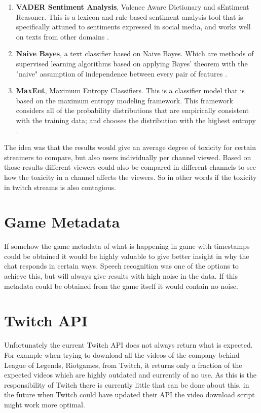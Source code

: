 \documentclass[final]{report}
\begin{document}
\begin{enumerate}
	\item \textbf{VADER Sentiment Analysis}, Valence Aware Dictionary and sEntiment Reasoner. This is a lexicon and rule-based sentiment analysis tool that is specifically attuned to sentiments expressed in social media, and works well on texts from other domains \cite{vader}.
	\item \textbf{Naive Bayes}, a text classifier based on Naive Bayes. Which are methods of supervised learning algorithms based on applying Bayes' theorem with the "naive" assumption of independence between every pair of features \cite{naivebayes}.
	\item \textbf{MaxEnt}, Maximum Entropy Classifiers. This is a classifier model that is based on the maximum entropy modeling framework. This framework considers all of the probability distributions that are empirically consistent with the training data; and chooses the distribution with the highest entropy \cite{maxent}.
\end{enumerate}

The idea was that the results would give an average degree of toxicity for certain streamers to compare, but also users individually per channel viewed. Based on those results different viewers could also be compared in different channels to see how the toxicity in a channel affects the viewers. So in other words if the toxicity in twitch streams is also contagious.

\section{Game Metadata}

If somehow the game metadata of what is happening in game with timestamps could be obtained it would be highly valuable to give better insight in why the chat responds in certain ways. Speech recognition was one of the options to achieve this, but will always give results with high noise in the data. If this metadata could be obtained from the game itself it would contain no noise.

\section{Twitch API}

Unfortunately the current Twitch API does not always return what is expected. For example when trying to download all the videos of the company behind League of Legends, Riotgames, from Twitch, it returns only a fraction of the expected videos which are highly outdated and currently of no use. As this is the responsibility of Twitch there is currently little that can be done about this, in the future when Twitch could have updated their API the video download script might work more optimal.
\end{document}
